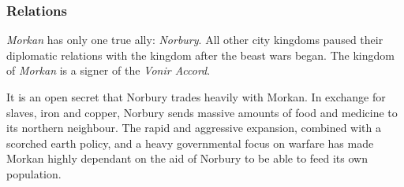 \subsubsection*{Relations}

\emph{Morkan} has only one true ally: \emph{Norbury}. All other city kingdoms
paused their diplomatic relations with the kingdom after the beast wars began.
The kingdom of \emph{Morkan} is a signer of the \emph{Vonir Accord}.

It is an open secret that Norbury trades heavily with Morkan. In exchange for
slaves, iron and copper, Norbury sends massive amounts of food and medicine to
its northern neighbour. The rapid and aggressive expansion, combined with a
scorched earth policy, and a heavy governmental focus on warfare has made
Morkan highly dependant on the aid of Norbury to be able to feed its own
population.
